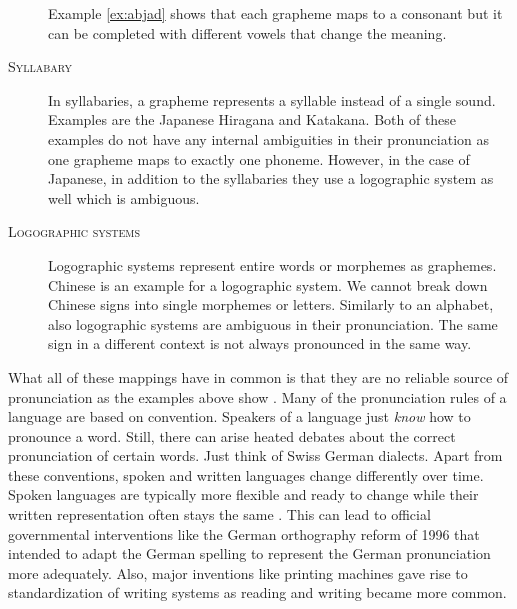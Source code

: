 \begin{description}
Example \ref{ex:abjad} shows that each grapheme maps to a consonant but it can be completed with different vowels that change the meaning.

\item[\textsc{Syllabary}] In syllabaries, a grapheme represents a syllable instead of a single sound. Examples are the Japanese Hiragana and Katakana. Both of these examples do not have any internal ambiguities in their pronunciation as one grapheme maps to exactly one phoneme. However, in the case of Japanese, in addition to the syllabaries they use a logographic system as well which is ambiguous.  

\item[\textsc{Logographic systems}] Logographic systems represent entire words or morphemes as graphemes. Chinese is an example for a logographic system. We cannot break down Chinese signs into single morphemes or letters. Similarly to an alphabet, also logographic systems are ambiguous in their pronunciation. The same sign in a different context is not always pronounced in the same way.  
\end{description}

What all of these mappings have in common is that they are no reliable source of pronunciation as the examples above show \citep{Intro.2007}. Many of the pronunciation rules of a language are based on convention. Speakers of a language just \textit{know} how to pronounce a word. Still, there can arise heated debates about the correct pronunciation of certain words. Just think of Swiss German dialects. Apart from these conventions, spoken and written languages change differently over time. Spoken languages are typically more flexible and ready to change while their written representation often stays the same \citep{unicode-lingu}. This can lead to official governmental interventions like the German orthography reform of 1996 that intended to adapt the German spelling to represent the German pronunciation more adequately. Also, major inventions like printing machines gave rise to standardization of writing systems as reading and writing became more common.

